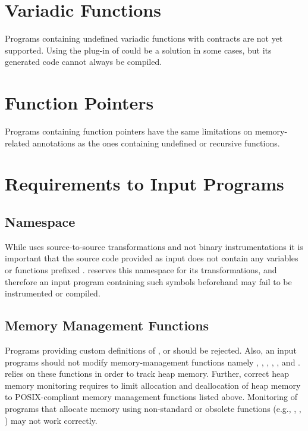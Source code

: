 
\section{Variadic Functions}

Programs containing undefined variadic functions with contracts
are not yet supported. Using the \variadic plug-in of \framac could be a
solution in some cases, but its generated code cannot always be compiled.

\section{Function Pointers}

Programs containing function pointers have the same limitations on
memory-related annotations as the ones containing undefined or recursive
functions.

\section{Requirements to Input Programs}

\subsection{\eacsl Namespace}
While \eacsl uses source-to-source transformations and not binary
instrumentations it is important that the source code provided as input does
not contain any variables or functions prefixed .  \eacsl
reserves this namespace for its transformations, and therefore an input program
containing such symbols beforehand may fail to be instrumented or compiled.

\subsection{Memory Management Functions}
Programs providing custom definitions of ,  or
 should be rejected. Also, an input programs should not modify
memory-management functions namely , , ,
, ,  and .  \eacsl relies
on these functions in order to track heap memory. Further, correct heap memory
monitoring requires to limit allocation and deallocation of heap memory to
POSIX-compliant memory management functions
listed above. Monitoring of programs that allocate memory using non-standard or
obsolete functions (e.g., , , ) may not work
correctly.
